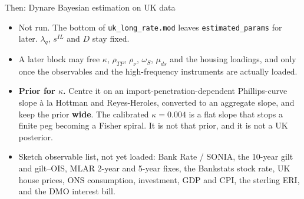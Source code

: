 \documentclass[11pt,aspectratio=169]{beamer}
\begin{document}
\begin{frame}{Then: Dynare Bayesian estimation on UK data}
  \begin{itemize}
    \item Not run. The bottom of \texttt{uk\_long\_rate.mod} leaves
          \texttt{estimated\_params} for later.
          $\lambda_{q}$, $s^{IL}$ and $D$ stay fixed.
    \item A later block may free $\kappa$, $\rho_{TP}$, $\rho_{\nu}$,
          $\omega_{S}$, $\mu_{ds}$ and the housing loadings, and only
          once the observables and the high-frequency instruments
          are actually loaded.
    \item \textbf{Prior for $\kappa$.}
          Centre it on an import-penetration-dependent Phillips-curve
          slope \`a la Hottman and Reyes-Heroles, converted to an
          aggregate slope, and keep the prior \textbf{wide}.
          The calibrated $\kappa=0.004$ is a flat slope that stops a
          finite peg becoming a Fisher spiral. It is not that prior,
          and it is not a UK posterior.
    \item Sketch observable list, not yet loaded: Bank Rate / SONIA,
          the 10-year gilt and gilt--OIS, MLAR 2-year and 5-year fixes,
          the Bankstats stock rate, UK house prices, ONS consumption,
          investment, GDP and CPI, the sterling ERI, and the DMO
          interest bill.
  \end{itemize}
\end{frame}
\end{document}
